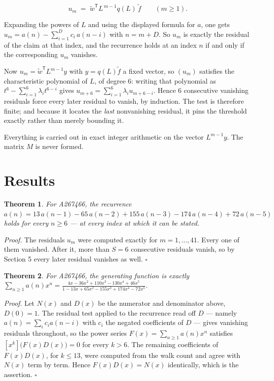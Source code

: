 \documentclass[11pt]{article}
\newtheorem{theorem}{Theorem}
\theoremstyle{definition}
\begin{document}
\[u_m \;=\; \tilde w^{\mathsf T} L^{\,m-1} q(L)\,\tilde f \qquad (m \ge 1).\]

Expanding the powers of $L$ and using the displayed formula for $a$, one gets $u_m = a(n) - \sum_{i=1}^{D} c_i\,a(n-i)$ with $n = m + D$. So $u_m$ is exactly the residual of the claim at that index, and the recurrence holds at an index $n$ if and only if the corresponding $u_m$ vanishes.

Now $u_m = \tilde w^{\mathsf T} L^{m-1} y$ with $y = q(L)\tilde f$ a fixed vector, so $(u_m)$ satisfies the characteristic polynomial of $L$, of degree $6$: writing that polynomial as $t^{6} - \sum_{i=1}^{6} \lambda_i t^{6-i}$ gives $u_{m+6} = \sum_{i=1}^{6} \lambda_i u_{m+6-i}$. Hence $6$ consecutive vanishing residuals force every later residual to vanish, by induction. The test is therefore finite; and because it locates the {\itshape last} nonvanishing residual, it pins the threshold exactly rather than merely bounding it.

Everything is carried out in exact integer arithmetic on the vector $L^{m-1}y$. The matrix $M$ is never formed.

\section{Results}

\begin{theorem} For A267466, the recurrence $a(n) = 13\,a(n-1) - 65\,a(n-2) + 155\,a(n-3) - 174\,a(n-4) + 72\,a(n-5)$ holds for every $n \ge 6$ --- at every index at which it can be stated.\end{theorem}

{\itshape Proof.} The residuals $u_m$ were computed exactly for $m = 1,\dots,41$. Every one of them vanished. After it, more than $S = 6$ consecutive residuals vanish, so by Section 5 every later residual vanishes as well. $\square$

\begin{theorem} For A267466, the generating function is exactly $\sum_{n\ge 1} a(n)x^n = \frac{4x - 36x^{2} + 110x^{3} - 130x^{4} + 46x^{5}}{1 - 13x + 65x^{2} - 155x^{3} + 174x^{4} - 72x^{5}}$.\end{theorem}

{\itshape Proof.} Let $N(x)$ and $D(x)$ be the numerator and denominator above, $D(0)=1$. The residual test applied to the recurrence read off $D$ --- namely $a(n) = \sum_i c_i a(n-i)$ with $c_i$ the negated coefficients of $D$ --- gives vanishing residuals throughout, so the power series $F(x)=\sum_{n\ge 1}a(n)x^n$ satisfies $[x^k]\bigl(F(x)D(x)\bigr) = 0$ for every $k > 6$. The remaining coefficients of $F(x)D(x)$, for $k \le 13$, were computed from the walk count and agree with $N(x)$ term by term. Hence $F(x)D(x) = N(x)$ identically, which is the assertion. $\square$
\end{document}
